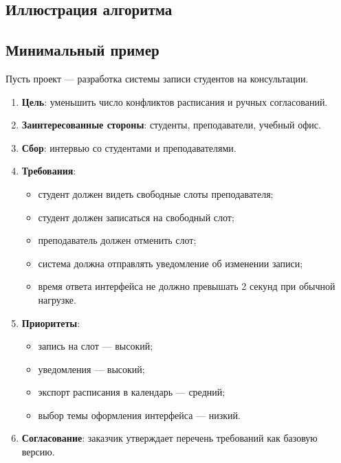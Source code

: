 \documentclass[12pt,a4paper]{article}
\begin{document}
\subsection{Иллюстрация алгоритма}

\begin{center}
\end{center}

\subsection{Минимальный пример}

Пусть проект --- разработка системы записи студентов на консультации.

\begin{enumerate}
    \item \textbf{Цель}: уменьшить число конфликтов расписания и ручных согласований.
    \item \textbf{Заинтересованные стороны}: студенты, преподаватели, учебный офис.
    \item \textbf{Сбор}: интервью со студентами и преподавателями.
    \item \textbf{Требования}:
    \begin{itemize}
        \item студент должен видеть свободные слоты преподавателя;
        \item студент должен записаться на свободный слот;
        \item преподаватель должен отменить слот;
        \item система должна отправлять уведомление об изменении записи;
        \item время ответа интерфейса не должно превышать 2 секунд при обычной нагрузке.
    \end{itemize}
    \item \textbf{Приоритеты}:
    \begin{itemize}
        \item запись на слот --- высокий;
        \item уведомления --- высокий;
        \item экспорт расписания в календарь --- средний;
        \item выбор темы оформления интерфейса --- низкий.
    \end{itemize}
    \item \textbf{Согласование}: заказчик утверждает перечень требований как базовую версию.
\end{enumerate}
\end{document}
